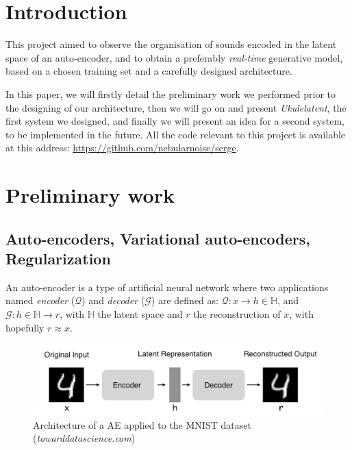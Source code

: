 \documentclass[11pt, english]{article}
\begin{document}
\newcommand{\CC}{C\nolinebreak\hspace{-.05em}\raisebox{.4ex}{\tiny\bf +}\nolinebreak\hspace{-.10em}\raisebox{.4ex}{\tiny\bf +}}
\def\CC{{C\nolinebreak[4]\hspace{-.05em}\raisebox{.4ex}{\tiny\bf ++}}}

\tableofcontents
\newpage
\section*{Introduction}

This project aimed to observe the organisation of sounds encoded in the latent space of an auto-encoder, and to obtain a preferably \textit{real-time} generative model, based on a chosen training set and a carefully designed architecture.

In this paper, we will firstly detail the preliminary work we performed prior to the designing of our architecture, then we will go on and present \textit{Ukulelatent}, the first system we designed, and finally we will present an idea for a second system, to be implemented in the future.
All the code relevant to this project is available at this address: \href{https://github.com/nebularnoise/serge}{https://github.com/nebularnoise/serge}.

\section{Preliminary work}
\subsection{Auto-encoders, Variational auto-encoders, Regularization}

An auto-encoder is a type of artificial neural network where two applications named \textit{encoder} ($\mathcal Q$) and \textit{decoder} ($\mathcal G$) are defined as: $\mathcal Q: x \longrightarrow h \in \mathbb H$, and $\mathcal G: h \in \mathbb H \longrightarrow r$, with $\mathbb H$ the latent space and $r$ the reconstruction of $x$, with hopefully $r \approx x$.

\begin{figure}[!h]
    \centering
    \includegraphics[width=.7\linewidth]{img/architecture_ae.png}
    \caption{Architecture of a AE applied to the MNIST dataset (\textit{towarddatascience.com})}
    \label{fig:schema_AE}
\end{figure}
\end{document}
